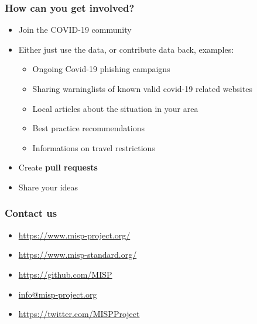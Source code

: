 \begin{frame}
\frametitle{How can you get involved?}
    \begin{itemize}
        \item Join the COVID-19 community
        \item Either just use the data, or contribute data back, examples:
        \begin{itemize}
            \item Ongoing Covid-19 phishing campaigns
            \item Sharing warninglists of known valid covid-19 related websites
            \item Local articles about the situation in your area
            \item Best practice recommendations
            \item Informations on travel restrictions
        \end{itemize}
        \item Create {\bf pull requests}
        \item Share your ideas
    \end{itemize}
\end{frame}

\begin{frame}
  \frametitle{Contact us}
  \begin{itemize}
    \item \url{https://www.misp-project.org/}
    \item \url{https://www.misp-standard.org/}
    \item \url{https://github.com/MISP}
    \item \url{info@misp-project.org}
    \item \url{https://twitter.com/MISPProject}
  \end{itemize}
\end{frame}


